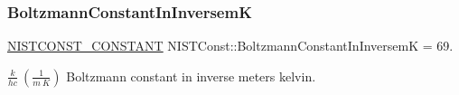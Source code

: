 \subsubsection{\texorpdfstring{Boltzmann\+Constant\+In\+InversemK}{BoltzmannConstantInInversemK}}
{\footnotesize\ttfamily \mbox{\hyperlink{group___n_i_s_t_const-_macros_ga2b0fc1d7452373f816175dd86ce26729}{N\+I\+S\+T\+C\+O\+N\+S\+T\+\_\+\+C\+O\+N\+S\+T\+A\+NT}} N\+I\+S\+T\+Const\+::\+Boltzmann\+Constant\+In\+InversemK = 69.}

$\frac{k}{h c} \ (\frac{1}{m\ K})$ Boltzmann constant in inverse meters kelvin. 